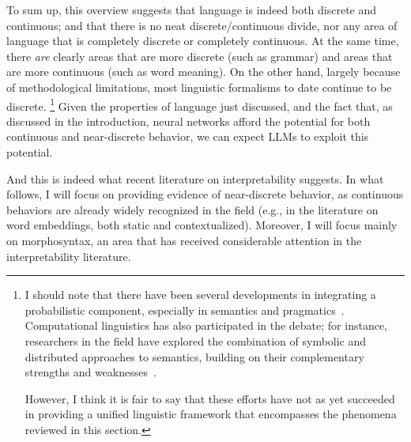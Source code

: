 To sum up, this overview suggests that language is indeed both discrete and continuous; and that there is no neat discrete/continuous divide, nor any area of language that is completely discrete or completely continuous.
At the same time, there \textit{are} clearly areas that are more discrete (such as grammar) and areas that are more continuous (such as word meaning).
On the other hand, largely because of methodological limitations, most linguistic formalisms to date continue to be discrete.
\footnote{I should note that there have been several developments in integrating a probabilistic component, especially in semantics and pragmatics~\cite[see][for an overview]{erk2022probabilistic}.
Computational linguistics has also participated in the debate; for instance, researchers in the field have explored the combination of symbolic and distributed approaches to semantics, building on their complementary strengths and weaknesses~\cite[see][]{boleda-herbelot-2016-formal}.

However, I think it is fair to say that these efforts have not as yet succeeded in providing a unified linguistic framework that encompasses the phenomena reviewed in this section.}
Given the properties of language just discussed, and the fact that, as discussed in the introduction, neural networks afford the potential for both continuous and near-discrete behavior, we can expect LLMs to exploit this potential.

And this is indeed what recent literature on interpretability suggests.
In what follows, I will focus on providing evidence of near-discrete behavior, as continuous behaviors are already widely recognized in the field (e.g., in the literature on word embeddings, both static and contextualized).
Moreover, I will focus mainly on morphosyntax, an area that has received considerable attention in the interpretability literature.
